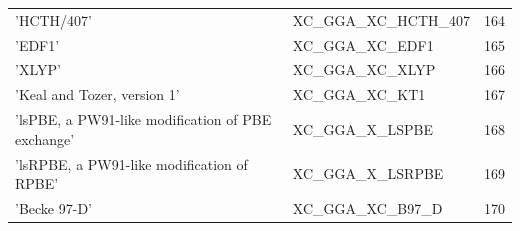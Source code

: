 \documentclass[final,12pt,makeidx,DIV=calc]{article}
\begin{document}
{{{{{{\begin{table}[!h]
\begin{center}
\begin{tabular}{llr}
  'HCTH/407' & XC\_GGA\_XC\_HCTH\_407  &164\\
  'EDF1' & XC\_GGA\_XC\_EDF1  &165\\
  'XLYP' & XC\_GGA\_XC\_XLYP  &166\\
  'Keal and Tozer, version 1' & XC\_GGA\_XC\_KT1  &167\\
  'lsPBE, a PW91-like modification of PBE exchange' & XC\_GGA\_X\_LSPBE  &168\\
  'lsRPBE, a PW91-like modification of RPBE' & XC\_GGA\_X\_LSRPBE  &169\\
  'Becke 97-D' & XC\_GGA\_XC\_B97\_D  &170\\
\hline
\hline
\end{tabular}
\end{center}
\end{table}

}}}}}}
\end{document}
